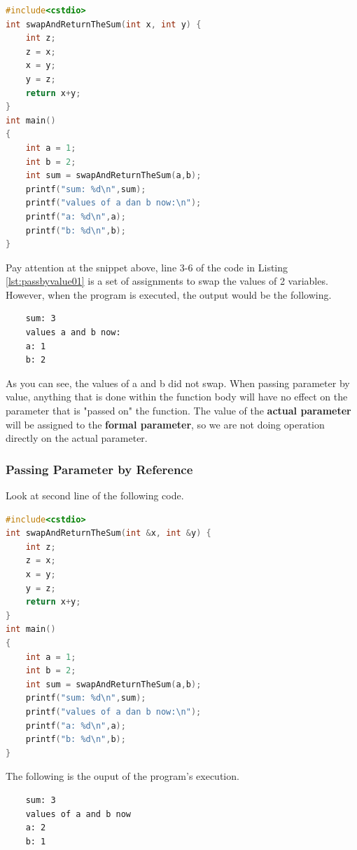 \begin{lstlisting}[language=c,caption = Passing by Value,label=lst:passbyvalue01]
#include<cstdio>
int swapAndReturnTheSum(int x, int y) {
    int z;
    z = x;
    x = y;
    y = z;
    return x+y;
}
int main()
{
    int a = 1;
    int b = 2;
    int sum = swapAndReturnTheSum(a,b);
    printf("sum: %d\n",sum);
    printf("values of a dan b now:\n");
    printf("a: %d\n",a);
    printf("b: %d\n",b);
}
\end{lstlisting}

Pay attention at the snippet above, line 3-6 of the code 
in Listing \ref{lst:passbyvalue01} is a set of assignments 
to swap the values of 2 variables. However, when the program 
is executed, the output would be the following.
\begin{verbatim}
    sum: 3
    values a and b now:
    a: 1
    b: 2
\end{verbatim}
As you can see, the values of a and b did not swap. 
When passing parameter by value, anything that is done 
within the function body will have no effect on the 
parameter that is "passed on" the function. The value of 
the \textbf{actual parameter} will be assigned to the \textbf{formal parameter}, 
so we are not doing operation directly on the actual parameter.


\subsubsection{Passing Parameter by Reference}
Look at second line of the following code.
\begin{lstlisting}[language=c,caption = Passing by Reference,label=lst:passbyreference01]
#include<cstdio>
int swapAndReturnTheSum(int &x, int &y) {
    int z;
    z = x;
    x = y;
    y = z;
    return x+y;
}
int main()
{
    int a = 1;
    int b = 2;
    int sum = swapAndReturnTheSum(a,b);
    printf("sum: %d\n",sum);
    printf("values of a dan b now:\n");
    printf("a: %d\n",a);
    printf("b: %d\n",b);
}
\end{lstlisting}
The following is the ouput of the program's execution.
\begin{verbatim}
    sum: 3
    values of a and b now
    a: 2
    b: 1
\end{verbatim}

